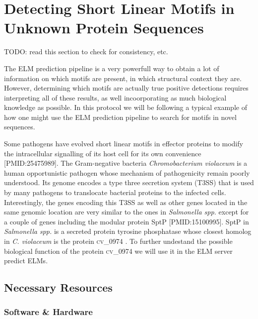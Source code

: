 \documentclass[12pt]{article}
\newcounter{proto}
\newcommand\uniprot[1]{%
	\textsc{\lowercase{#1}}%
}
\begin{document}
\clearpage

\section{Detecting Short Linear Motifs in Unknown Protein Sequences}
\label{sec:predicting_cv_0974}

TODO: read this section to check for consistency, etc.

The ELM prediction pipeline is a very powerfull way to obtain a lot of
information on which motifs are present, in which structural context they
are. However, determining which motifs are actually true positive detections
requires interpreting all of these results, as well incoorporating as much
biological knowledge as possible. In this protocol we will be following a
typical example of how one might use the ELM prediction pipeline to search for
motifs in novel sequences.

Some pathogens have evolved short linear motifs in effector proteins to modify
the intracellular signalling of its host cell for its own convenience
[PMID:25475989]. The Gram-negative bacteria \textit{Chromobacterium violaceum} is a
human opportunistic pathogen whose mechanism of pathogenicity remain poorly
understood. Its genome encodes a type three secretion system (T3SS) that is
used by many pathogens to translocate bacterial proteins to the infected cells.
Interestingly, the genes encoding this T3SS as well as other genes located in
the same genomic location are very similar to the ones in \textit{Salmonella spp.}
except for a couple of genes including the modular protein SptP
[PMID:15100995]. SptP in \textit{Salmonella spp.} is a secreted protein tyrosine
phosphatase \cite{8866485} whose closest homolog in \textit{C. violaceum} is
the protein \uniprot{CV\_0974}. To further undestand the possible biological
function of the protein \uniprot{CV\_0974} we will use it in the ELM server
predict ELMs.

%
%
\subsection*{Necessary Resources}
\subsubsection*{Software \& Hardware}

\end{document}
